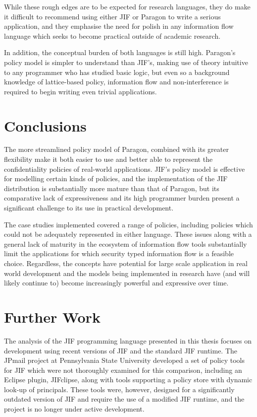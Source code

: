 While these rough edges are to be expected for research languages, they do make it difficult to recommend using either JIF or Paragon to write a serious application, and they emphasise the need for polish in any information flow language which seeks to become practical outside of academic research.

In addition, the conceptual burden of both languages is still high. Paragon's policy model is simpler to understand than JIF's, making use of theory intuitive to any programmer who has studied basic logic, but even so a background knowledge of lattice-based policy, information flow and non-interference is required to begin writing even trivial applications.

\section{Conclusions}

The more streamlined policy model of Paragon, combined with its greater flexibility make it both easier to use and better able to represent the confidentiality policies of real-world applications. JIF's policy model is effective for modelling certain kinds of policies, and the implementation of the JIF distribution is substantially more mature than that of Paragon, but its comparative lack of expressiveness and its high programmer burden present a significant challenge to its use in practical development.

The case studies implemented covered a range of policies, including policies which could not be adequately represented in either language. These issues along with a general lack of maturity in the ecosystem of information flow tools substantially limit the applications for which security typed information flow is a feasible choice. Regardless, the concepts have potential for large scale application in real world development and the models being implemented in research have (and will likely continue to) become increasingly powerful and expressive over time.

\section{Further Work}

The analysis of the JIF programming language presented in this thesis focuses on development using recent versions of JIF and the standard JIF runtime. The JPmail project \cite{jpmailpage} at Pennsylvania State University developed a set of policy tools for JIF which were not thoroughly examined for this comparison, including an Eclipse plugin, JIFclipse, along with tools supporting a policy store with dynamic look-up of principals. These tools were, however, designed for a significantly outdated version of JIF and require the use of a modified JIF runtime, and the project is no longer under active development.

